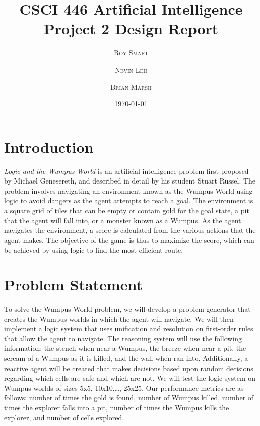 \documentclass{article}
\title{\vspace{-15mm}\fontsize{24pt}{10pt}\selectfont\textbf{CSCI 446 Artificial Intelligence \\[2mm] Project 2 Design Report} } %
\date{\today}
\author{
\large
\textsc{Roy Smart} \and \textsc{Nevin Leh} \and \textsc{Brian Marsh}\\[2mm] %
}
\begin{document}
	\maketitle %
	\thispagestyle{fancy} %
	\normalsize

	\section{Introduction}
	
		\textit{Logic and the Wumpus World} is an artificial intelligence problem first proposed by Michael Genesereth, and described in detail by his student Stuart Russel\cite{ai}.  The problem involves navigating an environment known as the Wumpus World using logic to avoid dangers as the agent attempts to reach a goal.  The environment is a square grid of tiles that can be empty or contain gold for the goal state, a pit that the agent will fall into, or a monster known as a Wumpus.  As the agent navigates the environment, a score is calculated from the various actions that the agent makes.  The objective of the game is thus to maximize the score, which can be achieved by using logic to find the most efficient route.
	
	\section{Problem Statement}
	
		To solve the Wumpus World problem, we will develop a problem generator that creates the Wumpus worlds in which the agent will navigate.  We will then implement a logic system that uses unification and resolution on first-order rules that allow the agent to navigate.  The reasoning system will use the following information: the stench when near a Wumpus, the breeze when near a pit, the scream of a Wumpus as it is killed, and the wall when ran into.  Additionally, a reactive agent will be created that makes decisions based upon random decisions regarding which cells are safe and which are not.  We will test the logic system on Wumpus worlds of sizes {5x5, 10x10,…, 25x25}.  Our performance metrics are as follows: number of times the gold is found, number of Wumpus killed, number of times the explorer falls into a pit, number of times the Wumpus kills the explorer, and number of cells explored.
	
\end{document}
